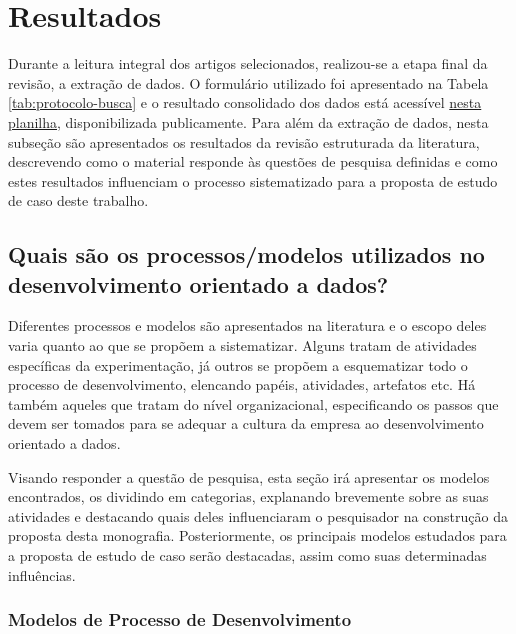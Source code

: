 \section{Resultados}
\label{sec:rsl-resultados}

Durante a leitura integral dos artigos selecionados, realizou-se a etapa final da revisão, a extração de dados. O formulário utilizado foi apresentado na Tabela \ref{tab:protocolo-busca} e o resultado consolidado dos dados está acessível \href{https://docs.google.com/spreadsheets/d/1LyB3fCxzzelQDfBpfCC4t2Z91LUd1-lA/edit?usp=sharing&ouid=105055060757466273844&rtpof=true&sd=true}{nesta planilha}, disponibilizada publicamente. Para além da extração de dados, nesta subseção são apresentados os resultados da revisão estruturada da literatura, descrevendo como o material responde às questões de pesquisa definidas e como estes resultados influenciam o processo sistematizado para a proposta de estudo de caso deste trabalho.

\subsection{Quais são os processos/modelos utilizados no desenvolvimento orientado a dados?}

Diferentes processos e modelos são apresentados na literatura e o escopo deles varia quanto ao que se propõem a sistematizar. Alguns tratam de atividades específicas da experimentação, já outros se propõem a esquematizar todo o processo de desenvolvimento, elencando papéis, atividades, artefatos etc. Há também aqueles que tratam do nível organizacional, especificando os passos que devem ser tomados para se adequar a cultura da empresa ao desenvolvimento orientado a dados.

Visando responder a questão de pesquisa, esta seção irá apresentar os modelos encontrados, os dividindo em categorias, explanando brevemente sobre as suas atividades e destacando quais deles influenciaram o pesquisador na construção da proposta desta monografia. Posteriormente, os principais modelos estudados para a proposta de estudo de caso serão destacadas, assim como suas determinadas influências.


\subsubsection{Modelos de Processo de Desenvolvimento}

